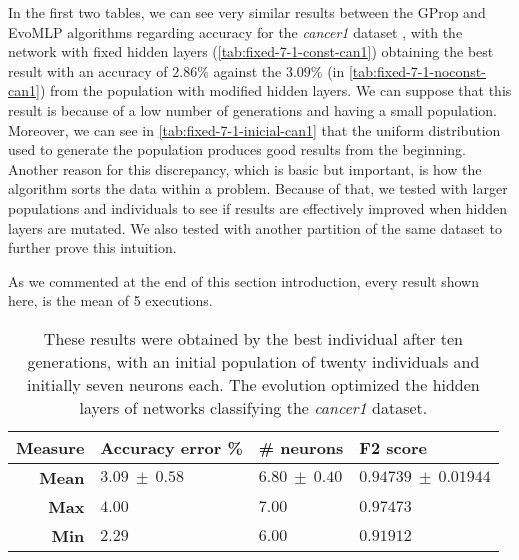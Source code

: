 \documentclass[runningheads]{llncs}
\begin{document}
In the first two tables, we can see very similar results between the GProp and
{\sf EvoMLP} algorithms regarding accuracy for
the \emph{cancer1} dataset \cite{uci}, with the network with fixed hidden layers
(\autoref{tab:fixed-7-1-const-can1}) obtaining the best result with an accuracy
of $2.86\%$ against the $3.09\%$ (in \autoref{tab:fixed-7-1-noconst-can1}) from
the population with modified hidden layers. We can suppose that this result is
because of a low number of generations and having a small population. Moreover,
we can see in \autoref{tab:fixed-7-1-inicial-can1} that the uniform
distribution used to generate the population produces good results from the
beginning. Another reason for this discrepancy, which is basic but important, is
how the algorithm sorts the data within a problem. Because of that, we tested
with larger populations and individuals to see if results are effectively
improved when hidden layers are mutated. We also tested with another partition
of the same dataset to further prove this intuition. %

As we commented at the end of this section introduction, every result shown
here, is the mean of 5 executions. %

 \begin{table}
     \centering
     \caption{
These results were obtained by the best individual after ten generations,
with an initial population of twenty individuals and initially seven neurons each.
The evolution optimized the hidden layers of networks classifying the \emph{cancer1} dataset.}
     \label{tab:fixed-7-1-noconst-can1}
     \begin{tabular}{rlll}
         \textbf{Measure}   & \textbf{Accuracy error \%} & \textbf{\# neurons} & \textbf{F2 score} \\
         \hline
         \textbf{Mean}      & $3.09\ \pm\ 0.58$      & $6.80\ \pm\ 0.40$       & $0.94739\ \pm\ 0.01944$ \\
         \textbf{Max}       & $4.00$                 & $7.00$                  & $0.97473$               \\
         \textbf{Min}       & $2.29$                 & $6.00$                  & $0.91912$               \\
     \end{tabular}
 \end{table}
\end{document}
